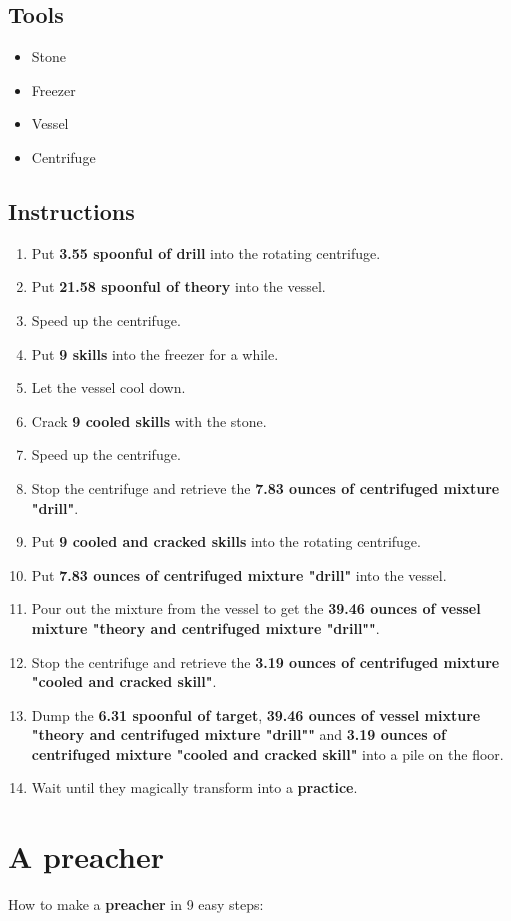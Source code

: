 \documentclass{article}
\begin{document}
\subsection{Tools}\begin{itemize}
\item 
Stone
\item 
Freezer
\item 
Vessel
\item 
Centrifuge
\end{itemize}
\subsection{Instructions}\begin{enumerate}
\item 
Put \textbf{3.55 spoonful of drill} into the rotating centrifuge.
\item 
Put \textbf{21.58 spoonful of theory} into the vessel.
\item 
Speed up the centrifuge.
\item 
Put \textbf{9 skills} into the freezer for a while.
\item 
Let the vessel cool down.
\item 
Crack \textbf{9 cooled skills} with the stone.
\item 
Speed up the centrifuge.
\item 
Stop the centrifuge and retrieve the \textbf{7.83 ounces of centrifuged mixture "drill"}.
\item 
Put \textbf{9 cooled and cracked skills} into the rotating centrifuge.
\item 
Put \textbf{7.83 ounces of centrifuged mixture "drill"} into the vessel.
\item 
Pour out the mixture from the vessel to get the \textbf{39.46 ounces of vessel mixture "theory and centrifuged mixture "drill""}.
\item 
Stop the centrifuge and retrieve the \textbf{3.19 ounces of centrifuged mixture "cooled and cracked skill"}.
\item 
Dump the \textbf{6.31 spoonful of target}, \textbf{39.46 ounces of vessel mixture "theory and centrifuged mixture "drill""} and \textbf{3.19 ounces of centrifuged mixture "cooled and cracked skill"} into a pile on the floor.
\item 
Wait until they magically transform into a \textbf{practice}.
\end{enumerate}
\newpage
\section{A preacher}How to make a \textbf{preacher} in 9 easy steps:
\end{document}
